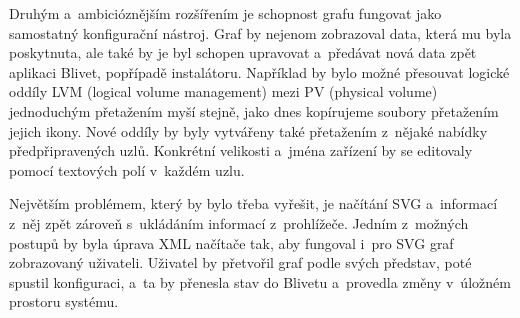 \documentclass[color,table,oneside,nolot,nolof]{fithesis}
\begin{document}
	Druhým a~ambicióznějším rozšířením je schopnost grafu fungovat jako samostatný konfigurační nástroj. Graf by nejenom zobrazoval data, která mu byla poskytnuta, ale také by je byl
	schopen upravovat a~předávat nová data zpět aplikaci Blivet, popřípadě instalátoru. Například by bylo možné přesouvat logické oddíly LVM (logical volume
	management) mezi PV (physical volume) jednoduchým 
	přetažením myší stejně, jako dnes kopírujeme soubory přetažením jejich ikony. Nové oddíly by byly vytvářeny také přetažením z~nějaké nabídky předpřipravených uzlů. Konkrétní velikosti
	a~jména zařízení by se editovaly pomocí textových polí v~každém uzlu.
	
	Největším problémem, který by bylo třeba vyřešit, je načítání SVG a~informací z~něj zpět zároveň s~ukládáním informací z~prohlížeče. 
	Jedním z~možných postupů by byla úprava XML načítače tak, aby fungoval i~pro SVG graf zobrazovaný uživateli. Uživatel by přetvořil graf podle svých představ, poté spustil 
	konfiguraci, a~ta by přenesla stav do Blivetu a~provedla změny v~úložném prostoru systému. 

	\printbibliography
\end{document}
